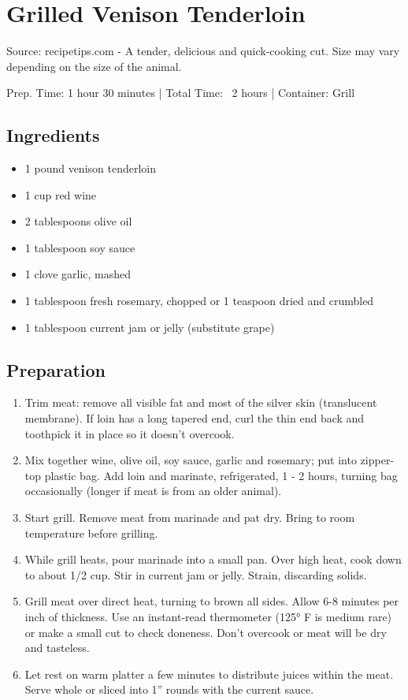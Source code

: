 \section{Grilled Venison Tenderloin}

Source: recipetips.com - A tender, delicious and quick-cooking cut. Size may vary depending on the size of the animal.

\noindent Prep. Time: 1 hour 30 minutes |
Total Time: ~2 hours | 
Container: Grill

\subsection{Ingredients}
\begin{multicols}{2}
\begin{itemize}
    \item 1 pound venison tenderloin
    \item 1 cup red wine
    \item 2 tablespoons olive oil
    \item 1 tablespoon soy sauce
    \item 1 clove garlic, mashed
    \item 1 tablespoon fresh rosemary, chopped or 1 teaspoon dried and crumbled
    \item 1 tablespoon current jam or jelly (substitute grape)
\end{itemize}
\end{multicols}

\subsection{Preparation}
\begin{enumerate}
    \item Trim meat: remove all visible fat and most of the silver skin (translucent membrane). If loin has a long tapered end, curl the thin end back and toothpick it in place so it doesn't overcook.
    \item Mix together wine, olive oil, soy sauce, garlic and rosemary; put into zipper-top plastic bag. Add loin and marinate, refrigerated, 1 - 2 hours, turning bag occasionally (longer if meat is from an older animal).
    \item Start grill. Remove meat from marinade and pat dry. Bring to room temperature before grilling.
    \item While grill heats, pour marinade into a small pan. Over high heat, cook down to about 1/2 cup. Stir in current jam or jelly. Strain, discarding solids.
    \item Grill meat over direct heat, turning to brown all sides. Allow 6-8 minutes per inch of thickness. Use an instant-read thermometer (125° F is medium rare) or make a small cut to check doneness. Don't overcook or meat will be dry and tasteless.
    \item Let rest on warm platter a few minutes to distribute juices within the meat. Serve whole or sliced into 1'' rounds with the current sauce.

\end{enumerate}
